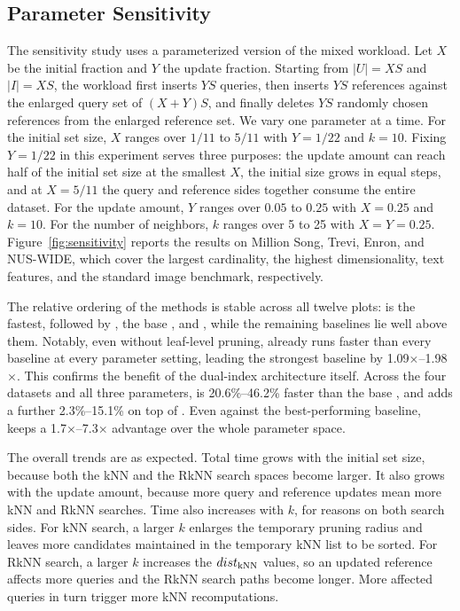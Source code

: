 \subsection{Parameter Sensitivity}\label{subsec:exp-sensitivity}

The sensitivity study uses a parameterized version of the mixed workload. Let $X$ be the initial fraction and $Y$ the update fraction. Starting from $|U|=XS$ and $|I|=XS$, the workload first inserts $YS$ queries, then inserts $YS$ references against the enlarged query set of $(X+Y)S$, and finally deletes $YS$ randomly chosen references from the enlarged reference set. We vary one parameter at a time. For the initial set size, $X$ ranges over $1/11$ to $5/11$ with $Y=1/22$ and $k=10$. Fixing $Y=1/22$ in this experiment serves three purposes: the update amount can reach half of the initial set size at the smallest $X$, the initial size grows in equal steps, and at $X=5/11$ the query and reference sides together consume the entire dataset. For the update amount, $Y$ ranges over $0.05$ to $0.25$ with $X=0.25$ and $k=10$. For the number of neighbors, $k$ ranges over 5 to 25 with $X=Y=0.25$. Figure~\ref{fig:sensitivity} reports the results on Million Song, Trevi, Enron, and NUS-WIDE, which cover the largest cardinality, the highest dimensionality, text features, and the standard image benchmark, respectively.

The relative ordering of the methods is stable across all twelve plots: \dualtreeopt is the fastest, followed by \dualtreefast, the base \dualtree, and \deltatree, while the remaining baselines lie well above them. Notably, even without leaf-level pruning, \dualtree already runs faster than every baseline at every parameter setting, leading the strongest baseline \deltatree by 1.09$\times$--1.98$\times$. This confirms the benefit of the dual-index architecture itself. Across the four datasets and all three parameters, \dualtreefast is 20.6\%--46.2\% faster than the base \dualtree, and \dualtreeopt adds a further 2.3\%--15.1\% on top of \dualtreefast. Even against the best-performing baseline, \dualtreeopt keeps a 1.7$\times$--7.3$\times$ advantage over the whole parameter space.

The overall trends are as expected. Total time grows with the initial set size, because both the kNN and the RkNN search spaces become larger. It also grows with the update amount, because more query and reference updates mean more kNN and RkNN searches. Time also increases with $k$, for reasons on both search sides. For kNN search, a larger $k$ enlarges the temporary pruning radius and leaves more candidates maintained in the temporary kNN list to be sorted. For RkNN search, a larger $k$ increases the $dist_{\operatorname{kNN}}$ values, so an updated reference affects more queries and the RkNN search paths become longer. More affected queries in turn trigger more kNN recomputations.

